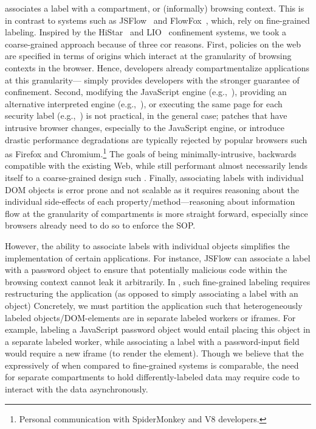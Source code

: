 \sys{} associates a label with a compartment, or (informally) browsing
context.
%
This is in contrast to systems such as JSFlow~\cite{Hedin:2012} and
FlowFox~\cite{DeGroef:2012}, which, rely on fine-grained labeling.
%
Inspired by the HiStar~\cite{Zeldovich:2006} and
LIO~\cite{stefan:2011:flexible} confinement systems, we took a coarse-grained
approach because of three cor reasons.
%
First, policies on the web are specified in terms of origins which
interact at the granularity of browsing contexts in the browser.
%
Hence, developers already compartmentalize applications at this
granularity---\sys{} simply provides developers with the stronger
guarantee of confinement.
%
Second, modifying the JavaScript engine
(e.g.,~), providing an alternative interpreted
engine (e.g.,~\cite{Hedin:2012}), or executing the same page for each
security label (e.g.,~\cite{DeGroef:2012}) is not practical, in the
general case; patches that have intrusive browser changes, especially
to the JavaScript engine, or introduce drastic performance
degradations are typically rejected by popular browsers such as
Firefox and Chromium.\footnote{
  Personal communication with SpiderMonkey and V8 developers.
}
%
The goals of being minimally-intrusive, backwards compatible with the
existing Web, while still performant almost necessarily lends itself
to a coarse-grained design such \sys{}.
%
Finally, associating labels with individual DOM objects is error
prone and not scalable as it requires reasoning about the individual
side-effects of each property/method---reasoning about information
flow at the granularity of compartments is more straight forward,
especially since browsers already need to do so to enforce the SOP.


However, the ability to associate labels with individual objects
simplifies the implementation of certain applications. 
%
For instance, JSFlow can associate a label with a password object
to ensure that potentially malicious code within the browsing context
cannot leak it arbitrarily.
%
In \sys{}, such fine-grained labeling requires restructuring the
application (as opposed to simply associating a label with an object)
%
Concretely, we must partition the application such that
heterogeneously labeled objects/DOM-elements are in separate labeled
workers or iframes.
%
For example, labeling a JavaScript password object would entail
placing this object in a separate labeled worker, while associating a
label with a password-input field would require a new iframe (to
render the element).
%
Though we believe that the expressively of \sys{} when compared to
fine-grained systems is comparable, the need for separate compartments
to hold differently-labeled data may require code to interact with the
data asynchronously.



